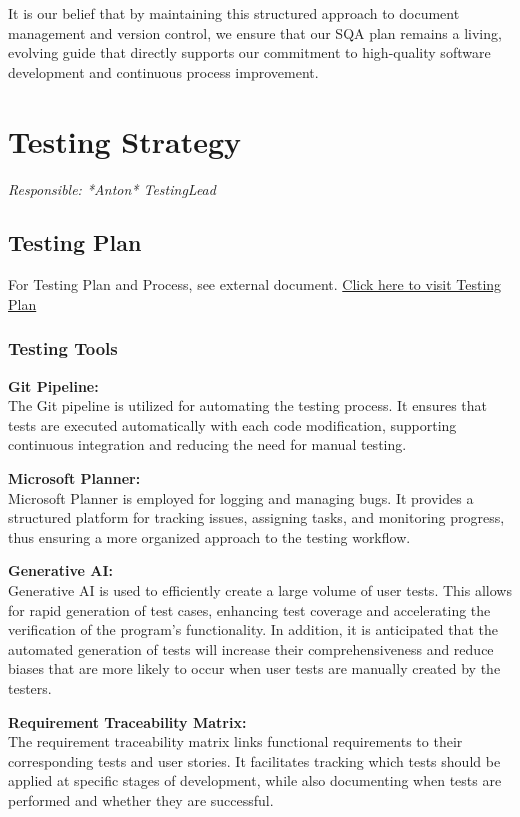 \documentclass{article}
\begin{document}
It is our belief that by maintaining this structured approach to document management and version control, we ensure that our SQA plan remains a living, evolving guide that directly supports our commitment to high-quality software development and continuous process improvement.


\newpage
\section{Testing Strategy}
\textit{Responsible: *Anton* TestingLead}

\subsection{Testing Plan}
For Testing Plan and Process, see external document. \href{https://www.overleaf.com/project/66ff9154fca1f68722259739}{Click here to visit Testing Plan}


\subsubsection{Testing Tools}

\textbf{Git Pipeline:} \\
The Git pipeline is utilized for automating the testing process. It ensures that tests are executed automatically with each code modification, supporting continuous integration and reducing the need for manual testing.

\textbf{Microsoft Planner:}\\ 
Microsoft Planner is employed for logging and managing bugs. It provides a structured platform for tracking issues, assigning tasks, and monitoring progress, thus ensuring a more organized approach to the testing workflow.

\textbf{Generative AI:}\\
Generative AI is used to efficiently create a large volume of user tests. This allows for rapid generation of test cases, enhancing test coverage and accelerating the verification of the program’s functionality. In addition, it is anticipated that the automated generation of tests will increase their comprehensiveness and reduce biases that are more likely to occur when user tests are manually created by the testers.

\textbf{Requirement Traceability Matrix:} \\
The requirement traceability matrix links functional requirements to their corresponding tests and user stories. It facilitates tracking which tests should be applied at specific stages of development, while also documenting when tests are performed and whether they are successful.
\end{document}
